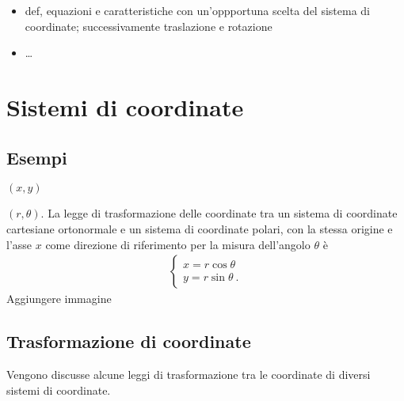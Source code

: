 \documentclass[letterpaper,10pt,english]{jupyterBook}
\begin{document}
\begin{itemize}
\begin{itemize}
\begin{itemize}
\item {} 
\sphinxAtStartPar
def, equazioni e caratteristiche con un’oppportuna scelta del sistema di coordinate; successivamente traslazione e rotazione

\item {} 
\sphinxAtStartPar
…

\end{itemize}

\end{itemize}

\end{itemize}

\sphinxstepscope


\section{Sistemi di coordinate}
\label{\detokenize{ch/analytic_geometry/analytic_geometry_2d/coordinates:sistemi-di-coordinate}}\label{\detokenize{ch/analytic_geometry/analytic_geometry_2d/coordinates:geometry-analytic-2d-coordinates}}\label{\detokenize{ch/analytic_geometry/analytic_geometry_2d/coordinates::doc}}

\subsection{Esempi}
\label{\detokenize{ch/analytic_geometry/analytic_geometry_2d/coordinates:esempi}}
\sphinxAtStartPar
{} \((x, y)\)

\sphinxAtStartPar
{} \((r, \theta)\). La legge di trasformazione delle coordinate tra un sistema di coordinate cartesiane ortonormale e un sistema di coordinate polari, con la stessa origine e l’asse \(x\) come direzione di riferimento per la misura dell’angolo \(\theta\) è
\begin{equation*}
\begin{split}\begin{cases}
  x = r \cos \theta \\
  y = r \sin \theta \ .
\end{cases}\end{split}
\end{equation*}
\sphinxAtStartPar
{} Aggiungere immagine


\subsection{Trasformazione di coordinate}
\label{\detokenize{ch/analytic_geometry/analytic_geometry_2d/coordinates:trasformazione-di-coordinate}}
\sphinxAtStartPar
Vengono discusse alcune leggi di trasformazione tra le coordinate di diversi sistemi di coordinate.
\end{document}

